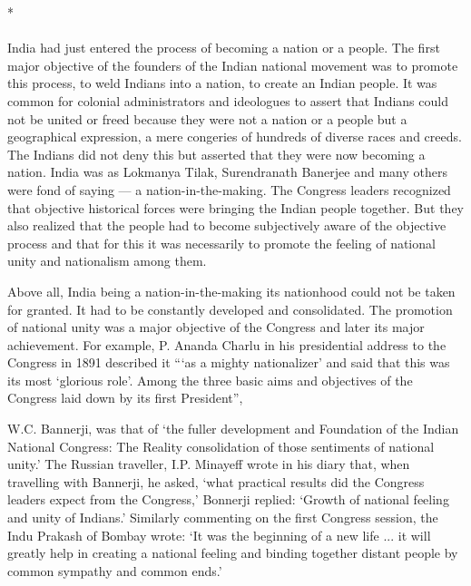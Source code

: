\begin{center}*\end{center}

\paragraph*{}

India had just entered the process of becoming a nation or a people. The first major objective of the founders of the Indian national movement was to promote this process, to weld Indians into a nation, to create an Indian people. It was common for colonial administrators and ideologues to assert that Indians could not be united or freed because they were not a nation or a people but a geographical expression, a mere congeries of hundreds of diverse races and creeds. The Indians did not deny this but asserted that they were now becoming a nation. India was as Lokmanya Tilak, Surendranath Banerjee and many others were fond of saying --- a nation-in-the-making. The Congress leaders recognized that objective historical forces were bringing the Indian people together. But they also realized that the people had to become subjectively aware of the objective process and that for this it was necessarily to promote the feeling of national unity and nationalism among them.

Above all, India being a nation-in-the-making its nationhood could not be taken for granted. It had to be constantly developed and consolidated. The promotion of national unity was a major objective of the Congress and later its major achievement. For example, P. Ananda Charlu in his presidential address to the Congress in 1891 described it ```as a mighty nationalizer' and said that this was its most `glorious role'. Among the three basic aims and objectives of the Congress laid down by its first President'',

W.C. Bannerji, was that of `the fuller development and Foundation of the Indian National Congress: The Reality consolidation of those sentiments of national unity.' The Russian traveller, I.P. Minayeff wrote in his diary that, when travelling with Bannerji, he asked, `what practical results did the Congress leaders expect from the Congress,' Bonnerji replied: `Growth of national feeling and unity of Indians.' Similarly commenting on the first Congress session, the Indu Prakash of Bombay wrote: `It was the beginning of a new life ... it will greatly help in creating a national feeling and binding together distant people by common sympathy and common ends.'

